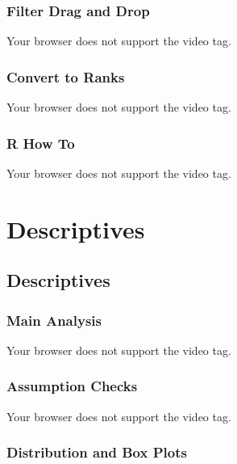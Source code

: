 \documentclass[
  letterpaper,
  DIV=11,
  numbers=noendperiod]{scrreprt}
\begin{document}
\hypertarget{filter-drag-and-drop}{%
\subsection{Filter Drag and Drop}\label{filter-drag-and-drop}}

Your browser does not support the video tag.

\hypertarget{convert-to-ranks}{%
\subsection{Convert to Ranks}\label{convert-to-ranks}}

Your browser does not support the video tag.

\hypertarget{r-how-to}{%
\subsection{R How To}\label{r-how-to}}

Your browser does not support the video tag.


\hypertarget{descriptives}{%
\chapter{Descriptives}\label{descriptives}}

\hypertarget{descriptives-1}{%
\section{Descriptives}\label{descriptives-1}}

\hypertarget{main-analysis}{%
\subsection{Main Analysis}\label{main-analysis}}

Your browser does not support the video tag.

\hypertarget{assumption-checks}{%
\subsection{Assumption Checks}\label{assumption-checks}}

Your browser does not support the video tag.

\hypertarget{distribution-and-box-plots}{%
\subsection{Distribution and Box
Plots}\label{distribution-and-box-plots}}
\end{document}
